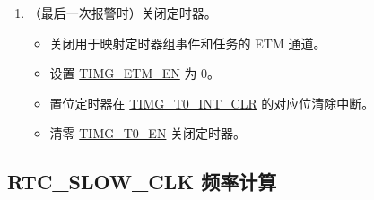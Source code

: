 \documentclass[main\_\_CN.tex]{subfiles}
\begin{document}
\begin{enumerate}
\begin{itemize}
    \end{itemize}
    \item（最后一次报警时）关闭定时器。
    \begin{itemize}
        \item 关闭用于映射定时器组事件和任务的 ETM 通道。
        \item 设置 \hyperref[fielddesc:TIMGETMEN]{TIMG\_ETM\_EN} 为 0。
        \item 置位定时器在 \hyperref[fielddesc:TIMGTXINTCLR]{TIMG\_T0\_INT\_CLR} 的对应位清除中断。
        \item 清零 \hyperref[fielddesc:TIMGTXEN]{TIMG\_T0\_EN} 关闭定时器。
    \end{itemize}
\end{enumerate}



\subsection{RTC\_SLOW\_CLK 频率计算}\label{sec:rtc-calibration-procedure}
\end{document}
